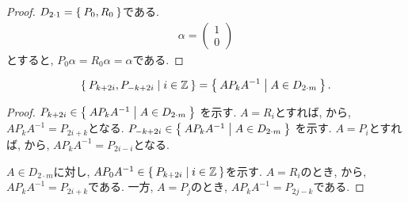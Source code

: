 \begin{proof}
  $D_{2\cdot 1}=\Set{P_0,R_0}$である.
  \begin{align*}
    \alpha=
    \begin{pmatrix}
      1\\0
      \end{pmatrix}
  \end{align*}
  とすると,
  $P_0\alpha = R_0\alpha= \alpha $である.
\end{proof}

\begin{lemma}
  \label{lem:i2m:conjclass:}
  \begin{align*}
    \Set{P_{k+2i},P_{-k+2i} | i \in \mathbb{Z}} = \Set{AP_kA^{-1} | A\in D_{2\cdot m}}.
  \end{align*}
\end{lemma}
\begin{proof}
  $P_{k+2i}\in \Set{AP_kA^{-1} | A\in D_{2\cdot m}}$
  を示す.
  $A=R_{i}$とすれば,
  から,
  $AP_{k}A^{-1}=P_{2i+k}$となる.
  $P_{-k+2i}\in \Set{AP_kA^{-1} | A\in D_{2\cdot m}}$
  を示す.
  $A=P_{i}$とすれば,
  から,
  $AP_{k}A^{-1}=P_{2i-i}$となる.

 $A\in D_{2\cdot m}$に対し,
 $AP_0A^{-1}\in \Set{P_{k+2i} | i \in \mathbb{Z}}$を示す.
 $A=R_i$のとき,
 から,
 $AP_kA^{-1}=P_{2i+k}$である.
 一方,
 $A=P_j$のとき,
 $AP_kA^{-1}=P_{2j-k}$である.
 \end{proof}

